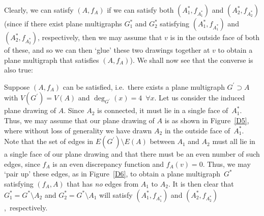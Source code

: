 \documentclass{article}
\newtheorem{Proof of Theorem}{Proof of Theorem}
\begin{document}
Clearly, we can satisfy $(A,f_{A})$ if we can satisfy both 
$\left( A_{1}^{*},f_{A_{1}^{*}} \right)$ and $\left( A_{2}^{*},f_{A_{2}^{*}} \right)$
(since if there exist plane multigraphs $G_{1}^{*}$ and $G_{2}^{*}$
satisfying $\left( A_{1}^{*},f_{A_{1}^{*}} \right)$ and $\left( A_{2}^{*},f_{A_{2}^{*}} \right)$, respectively,
then we may assume that $v$ is in the outside face of both of these,
and so we can then `glue' these two drawings together at $v$ to obtain a plane multigraph that satisfies $(A,f_{A})$).
We shall now see that the converse is also true:

Suppose $(A,f_{A})$ can be satisfied,
i.e.~there exists a plane multigraph $G^{\prime} \supset A$
with $V(G^{\prime})=V(A)$ and $\deg_{G^{\prime}}(x) = 4$~$\forall x$.
Let us consider the induced plane drawing of $A$.
Since $A_{2}$ is connected,
it must lie in a single face of~$A_{1}^{*}$.
Thus, we may assume that our plane drawing of $A$ is as shown in Figure~\ref{D5},
where without loss of generality we have drawn $A_{2}$ in the outside face of~$A_{1}^{*}$.
Note that the set of edges in $E(G^{\prime}) \setminus E(A)$
between $A_{1}$ and $A_{2}$ must all lie in a single face of our plane drawing
and that there must be an even number of such edges,
since $f_{A}$ is an even discrepancy function and $f_{A}(v)=0$.
Thus, we may `pair up' these edges,
as in Figure~\ref{D6},
to obtain a plane multigraph~$G^{*}$ satisfying $(f_{A},A)$ that has \textit{no} edges from $A_{1}$ to $A_{2}$.
It is then clear that $G_{1}^{*} = G^{*} \setminus A_{2}$ and $G_{2}^{*} = G^{*} \setminus A_{1}$
will satisfy $\left( A_{1}^{*},f_{A_{1}^{*}} \right)$ and $\left( A_{2}^{*},f_{A_{2}^{*}} \right)$,~respectively.
\end{document}
